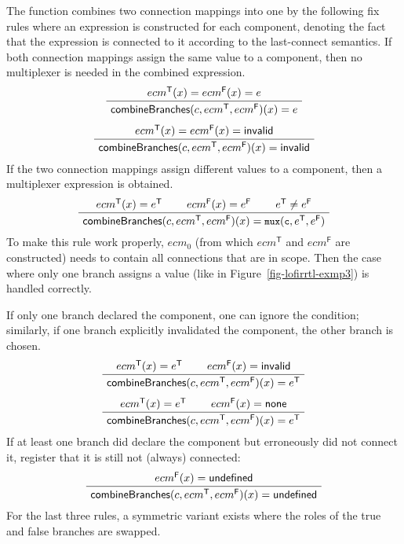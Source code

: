 The function {\combinebranches} combines two connection mappings into one by the following fix rules %
where an expression is constructed for each component, denoting the fact that the expression is connected to it according to the last-connect semantics.
If both connection mappings assign the same value to a component, then no multiplexer %
is needed in the combined expression.
\begin{gather*}
 \label{rule-expandwhen-combine-1}
    \infer[]
    {\combinebranches(c, ecm^\mathsf{T},ecm^\mathsf{F})(x) = e}
    {ecm^\mathsf{T}(x) = ecm^\mathsf{F}(x) = e}
\\[1ex]
 \label{rule-expandwhen-combine-2}
    \infer[]
    {\combinebranches(c, ecm^\mathsf{T},ecm^\mathsf{F})(x) = {\svinvalid}}
    {ecm^\mathsf{T}(x) = ecm^\mathsf{F}(x) = {\svinvalid}}
\end{gather*}
If the two connection mappings assign different values to a component, then a multiplexer %
expression is obtained.
\begin{gather*}
 \label{rule-expandwhen-combine-3}
    \inferiii[]
    {\combinebranches(c, ecm^\mathsf{T},ecm^\mathsf{F})(x) = \text{\prettyll{mux}}(\text{\prettyll{c}},e^\mathsf{T},e^\mathsf{F})}
    {ecm^\mathsf{T}(x) = e^\mathsf{T}}
    {ecm^\mathsf{F}(x) = e^\mathsf{F}}
    {e^\mathsf{T} \not= e^\mathsf{F}}
\end{gather*}
To make this rule work properly, $ecm_0$ (from which $ecm^\mathsf{T}$ and $ecm^\mathsf{F}$ are constructed)
needs to contain all connections that are in scope.
Then the case where only one branch assigns a value (like  in Figure~\ref{fig-lofirrtl-exmp3})
is handled correctly.

If only one branch declared the component, one can ignore the condition;
similarly, if one branch explicitly invalidated the component,
the other branch is chosen.
\begin{gather*}
 \label{rule-expandwhen-combine-4}
    \inferii[]
    {\combinebranches(c, ecm^\mathsf{T},ecm^\mathsf{F})(x) = e^\mathsf{T}}
    {ecm^\mathsf{T}(x) = e^\mathsf{T}}
    {ecm^\mathsf{F}(x) = {\svinvalid}}
\\[1ex]
 \label{rule-expandwhen-combine-5}
    \inferii[]
    {\combinebranches(c, ecm^\mathsf{T},ecm^\mathsf{F})(x) = e^\mathsf{T}}
    {ecm^\mathsf{T}(x) = e^\mathsf{T}}
    {ecm^\mathsf{F}(x) = \svnone}
\end{gather*}
If at least one branch did declare the component but erroneously did not connect it,
register that it is still not (always) connected:
\begin{gather*}
 \label{rule-expandwhen-combine-6}
    \infer[]
    {\combinebranches(c, ecm^\mathsf{T},ecm^\mathsf{F})(x) =\svundefined}
    {ecm^\mathsf{F}(x) = \svundefined}
\end{gather*}
For the last three rules, a symmetric variant exists where the roles of the true and false branches are swapped.

